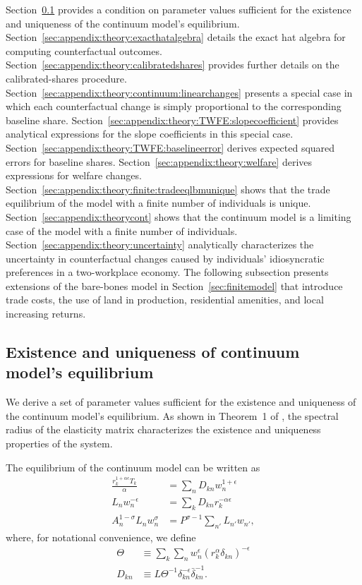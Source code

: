 \documentclass[11pt]{article}
\theoremstyle{definition}
\newcommand\idiosyncraticphrase{idiosyncratic preference}
\begin{document}
Section~\ref{sec:appendix:theory:continuumexistence} provides a condition on parameter values sufficient for the existence and uniqueness of the continuum model's equilibrium.
Section~\ref{sec:appendix:theory:exacthatalgebra} details the exact hat algebra for computing counterfactual outcomes.
Section~\ref{sec:appendix:theory:calibratedshares} provides further details on the calibrated-shares procedure.
Section~\ref{sec:appendix:theory:continuum:linearchanges} presents a special case in which each counterfactual change is simply proportional to the corresponding baseline share.
Section~\ref{sec:appendix:theory:TWFE:slopecoefficient} provides analytical expressions for the slope coefficients in this special case.
Section~\ref{sec:appendix:theory:TWFE:baselineerror} derives expected squared errors for baseline shares.
Section~\ref{sec:appendix:theory:welfare} derives expressions for welfare changes.
Section~\ref{sec:appendix:theory:finite:tradeeqlbmunique} shows that the trade equilibrium of the model with a finite number of individuals is unique.
Section~\ref{sec:appendix:theorycont} shows that the continuum model is a limiting case of the model with a finite number of individuals.
Section~\ref{sec:appendix:theory:uncertainty} analytically characterizes the uncertainty in counterfactual changes caused by individuals' \idiosyncraticphrase s in a two-workplace economy.
The following subsection presents extensions of the bare-bones model in Section~\ref{sec:finitemodel} that introduce 
trade costs, the use of land in production, residential amenities, and local increasing returns.



\subsection{Existence and uniqueness of continuum model's equilibrium}\label{sec:appendix:theory:continuumexistence}

We derive a set of parameter values sufficient for the existence and uniqueness of the continuum model's equilibrium.
As shown in Theorem~1 of , the spectral radius of the elasticity matrix characterizes the existence and uniqueness properties of the system.

The equilibrium of the continuum model can be written as
\begin{align}
    \frac{r_k^{1 + \alpha \epsilon} T_k}{\alpha} &= \sum_n D_{kn} w_n^{1+\epsilon} \label{eqn:20201030Crews2:land} \\
    L_n w_n^{-\epsilon} &= \sum_k D_{kn} r_k^{-\alpha \epsilon} \label{eqn:20201030Crews2:labor} \\
    A_n^{1-\sigma} L_n w_n^{\sigma} &= P^{\sigma-1} \sum_{n'} L_{n'} w_{n'}, \label{eqn:20201030Crews2:goods}
\end{align}
where, for notational convenience, we define
\begin{align*}
\Theta &\equiv \sum_{k}\sum_{n} w_{n}^{\epsilon} (r_k^{\alpha} \delta_{kn})^{-\epsilon}
\\
D_{kn} &\equiv L \Theta^{-1} \delta_{kn}^{-\epsilon} \bar{\delta}_{kn}^{-1}.
\end{align*}
\end{document}
